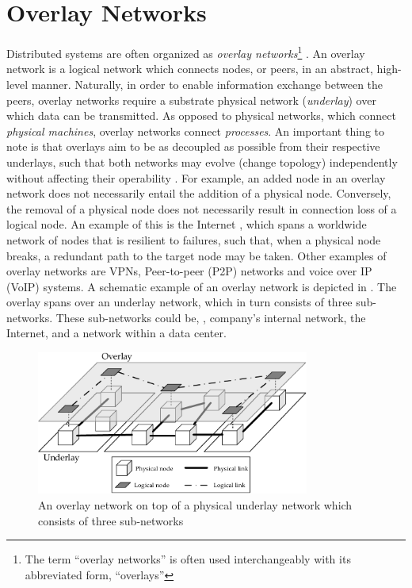 %
%
%
%
%
%
%
%
%
%

\section{Overlay Networks} \label{sec:overlays}
Distributed systems are often organized as \emph{overlay networks}\footnote{The term ``overlay networks'' is often used interchangeably with its abbreviated form, ``overlays''} \cite{tarkoma2010overlay}. An overlay network is a logical network which connects nodes, or peers, in an abstract, high-level manner. Naturally, in order to enable information exchange between the peers, overlay networks require a substrate physical network (\emph{underlay}) over which data can be transmitted. As opposed to physical networks, which connect \emph{physical machines}, overlay networks connect \emph{processes}. An important thing to note is that overlays aim to be as decoupled as possible from their respective underlays, such that both networks may evolve (change topology) independently without affecting their operability \cite{tanenbaum2017distributed}. For example, an added node in an overlay network does not necessarily entail the addition of a physical node. Conversely, the removal of a physical node does not necessarily result in connection loss of a logical node. An example of this is the Internet \cite{vaezi2017virtualization}, which spans a worldwide network of nodes that is resilient to failures, such that, when a physical node breaks, a redundant path to the target node may be taken. Other examples of overlay networks are VPNs, Peer-to-peer (P2P) networks and voice over IP (VoIP) systems. A schematic example of an overlay network is depicted in . The overlay spans over an underlay network, which in turn consists of three sub-networks. These sub-networks could be, \eg , company's internal network, the Internet, and a network within a data center.

\begin{figure}[htpb]
  \centering
  \includegraphics[width=0.8\textwidth]{figures/overlay.pdf}
  \caption[Overlay networking concept]{An overlay network on top of a physical underlay network which consists of three sub-networks}\label{fig:overlay}
\end{figure}

